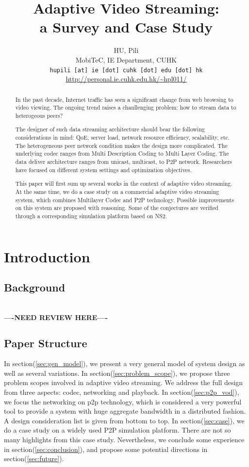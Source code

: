 \documentclass[11pt,a4paper]{article}
\author{HU, Pili \\
MobiTeC, IE Department, CUHK \\
\texttt{hupili [at] ie [dot] cuhk [dot] edu [dot] hk} \\
\url{http://personal.ie.cuhk.edu.hk/~hpl011/} 
}
\title{Adaptive Video Streaming: 
 \\ a Survey and Case Study}
\newcommand{\question}{\textbf{\\----NEED REVIEW HERE----\\}}
\begin{document}
\maketitle

\begin{abstract}
	In the past decade, Internet traffic has seen a significant 
	change from web browsing to video viewing. The ongoing trend 
	raises a chanllenging problem: how to stream data to heterogeous 
	peers? 
	
	The designer of such data streaming architecture should 
	bear the following considerations in mind: QoE, server load, 
	network resource efficiency, scalability, etc. The heterogeneous 
	peer network condition makes the design more complicated. The 
	underlying codec ranges from Multi Description Coding to Multi 
	Layer Coding. The data deliver architecture ranges from unicast,
	multicast, to P2P network. Researchers have focused on different 
	system settings and optimization objectives. 
	 
	This paper will first
	sum up several works in the context of adaptive video streaming. 
	At the same time, we do a case study on a commercial adaptive 
	video streaming system, which combines Multilayer Codec and P2P 
	technology. Possible improvements on this system are proposed
	with reasoning. Some of the conjectures are
	verified through a corresponding simulation platform based on NS2. 
\end{abstract}

\pagebreak
\tableofcontents
\pagebreak

\section{Introduction}

\subsection{Background}

\question

\subsection{Paper Structure}
In section(\ref{sec:gen_model}), we present a very general model 
of system design as well as several variations. In section(\ref{sec:problem_scope}), 
we propose three problem scopes involved in adaptive video streaming. 
We address the full design from three aspects: codec, networking and playback. 
In section(\ref{sec:p2p_vod}), we focus the networking on p2p technology, 
which is considered a very powerful tool to provide a system with huge 
aggregate bandwidth in a distributed fashion. A design consideration 
list is given from bottom to top. In section(\ref{sec:case}), we do 
a case study on a widely used P2P simulation platform\cite{huang2010simulation}. 
There are not so many highlights from this case study. Nevertheless, 
we conclude some experience in section(\ref{sec:conclusion}), and 
propose some potential directions in section(\ref{sec:future}). 
\end{document}
